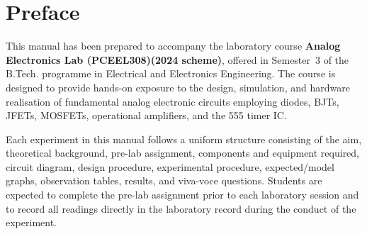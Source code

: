 \chapter*{Preface}
This manual has been prepared to accompany the laboratory course \textbf{Analog Electronics Lab (PCEEL308)(2024 scheme)}, offered in Semester~3 of the B.Tech. programme in Electrical and Electronics Engineering. The course is designed to provide hands-on exposure to the design, simulation, and hardware realisation of fundamental analog electronic circuits employing diodes, BJTs, JFETs, MOSFETs, operational amplifiers, and the 555 timer IC.

Each experiment in this manual follows a uniform structure consisting of the aim, theoretical background, pre-lab assignment, components and equipment required, circuit diagram, design procedure, experimental procedure, expected/model graphs, observation tables, results, and viva-voce questions. Students are expected to complete the pre-lab assignment prior to each laboratory session and to record all readings directly in the laboratory record during the conduct of the experiment.